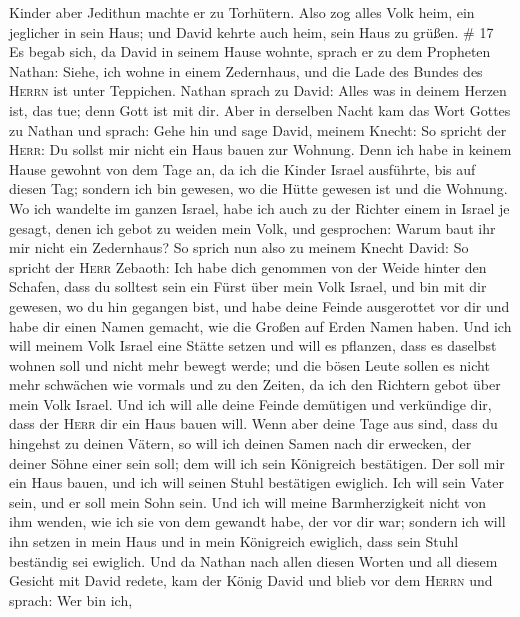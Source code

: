 Kinder aber Jedithun machte er zu Torhütern.  Also zog
alles Volk heim, ein jeglicher in sein Haus; und David kehrte auch heim,
sein Haus zu grüßen. \# 17  Es begab sich, da David in
seinem Hause wohnte, sprach er zu dem Propheten Nathan: Siehe, ich wohne
in einem Zedernhaus, und die Lade des Bundes des \textsc{Herrn} ist
unter Teppichen.  Nathan sprach zu David: Alles was in
deinem Herzen ist, das tue; denn Gott ist mit dir.  Aber
in derselben Nacht kam das Wort Gottes zu Nathan und sprach:
 Gehe hin und sage David, meinem Knecht: So spricht der
\textsc{Herr}: Du sollst mir nicht ein Haus bauen zur Wohnung.
 Denn ich habe in keinem Hause gewohnt von dem Tage an, da
ich die Kinder Israel ausführte, bis auf diesen Tag; sondern ich bin
gewesen, wo die Hütte gewesen ist und die Wohnung.  Wo ich
wandelte im ganzen Israel, habe ich auch zu der Richter einem in Israel
je gesagt, denen ich gebot zu weiden mein Volk, und gesprochen: Warum
baut ihr mir nicht ein Zedernhaus?  So sprich nun also zu
meinem Knecht David: So spricht der \textsc{Herr} Zebaoth: Ich habe dich
genommen von der Weide hinter den Schafen, dass du solltest sein ein
Fürst über mein Volk Israel,  und bin mit dir gewesen, wo
du hin gegangen bist, und habe deine Feinde ausgerottet vor dir und habe
dir einen Namen gemacht, wie die Großen auf Erden Namen haben.
 Und ich will meinem Volk Israel eine Stätte setzen und
will es pflanzen, dass es daselbst wohnen soll und nicht mehr bewegt
werde; und die bösen Leute sollen es nicht mehr schwächen wie vormals
und zu den Zeiten, da ich den Richtern gebot über mein Volk Israel.
 Und ich will alle deine Feinde demütigen und verkündige
dir, dass der \textsc{Herr} dir ein Haus bauen will. 
Wenn aber deine Tage aus sind, dass du hingehst zu deinen Vätern, so
will ich deinen Samen nach dir erwecken, der deiner Söhne einer sein
soll; dem will ich sein Königreich bestätigen.  Der soll
mir ein Haus bauen, und ich will seinen Stuhl bestätigen ewiglich.
 Ich will sein Vater sein, und er soll mein Sohn sein.
Und ich will meine Barmherzigkeit nicht von ihm wenden, wie ich sie von
dem gewandt habe, der vor dir war;  sondern ich will ihn
setzen in mein Haus und in mein Königreich ewiglich, dass sein Stuhl
beständig sei ewiglich.  Und da Nathan nach allen diesen
Worten und all diesem Gesicht mit David redete,  kam der
König David und blieb vor dem \textsc{Herrn} und sprach: Wer bin ich,

